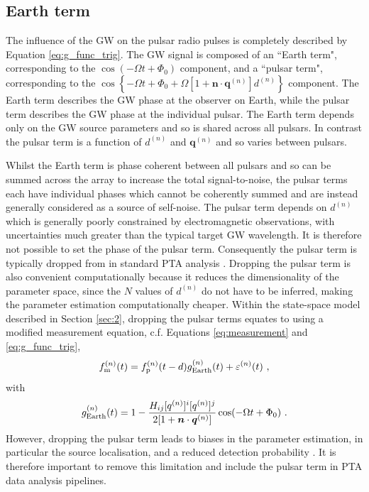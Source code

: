 \documentclass[fleqn,usenatbib,useAMS]{mnras}
\begin{document}
\subsection{Earth term}\label{sec:earth_term}
The influence of the GW on the pulsar radio pulses is completely described by Equation \eqref{eq:g_func_trig}. The GW signal is composed of an ``Earth term", corresponding to the $\cos(-\Omega t + \Phi_0)$ component, and a ``pulsar term", corresponding to the $\cos \left \{-\Omega t +\Phi_0 + \Omega \left[1 + \boldsymbol{n}\cdot \boldsymbol{q}^{(n)} \right]  d^{(n)} \right \}$ component. The Earth term describes the GW phase at the observer on Earth, while the pulsar term describes the GW phase at the individual pulsar. The Earth term depends only on the GW source parameters and so is shared across all pulsars. In contrast the pulsar term is a function of $d^{(n)}$ and $\boldsymbol{q}^{(n)}$ and so varies between pulsars. \newline 


Whilst the Earth term is phase coherent between all pulsars and so can be summed across the array to increase the total signal-to-noise, the pulsar terms each have individual phases which cannot be coherently summed and are instead generally considered as a source of self-noise. The pulsar term depends on $d^{(n)}$ which is generally poorly constrained by electromagnetic observations, with uncertainties much greater than the typical target GW wavelength. It is therefore not possible to set the phase of the pulsar term. Consequently the pulsar term is typically dropped from in standard PTA analysis \citep[e.g.][]{Sesana2010,Babak2012,Petiteau2013,Zhu2015,Taylors2016,Goldstein2018,Charisi2023arXiv230403786C}. Dropping the pulsar term is also convenient computationally because it reduces the dimensionality of the parameter space, since the $N$ values of $d^{(n)}$ do not have to be inferred, making the parameter estimation computationally cheaper. Within the state-space model described in Section \ref{sec:2}, dropping the pulsar terms equates to using a modified measurement equation, c.f. Equations \eqref{eq:measurement} and \eqref{eq:g_func_trig},
\begin{equation}
	f_{\rm m}^{(n)}(t) = f_{\rm p}^{(n)}(t-d) g^{(n)}_{\rm Earth}(t) + \varepsilon^{(n)}(t) \ , 
	\label{eq:measuremen_earth}
\end{equation}
with
\begin{equation}
	g^{(n)}_{\rm Earth}(t) = 1 - \frac{ H_{ij}[q^{(n)}]^i [q^{(n)}]^j}{2[1 + \boldsymbol{n}\cdot \boldsymbol{q}^{(n)}] }  \cos(-\Omega t +\Phi_0)  \ .
	\label{eq:g_func_trig_earth}
\end{equation}
However, dropping the pulsar term leads to biases in the parameter estimation, in particular the source localisation, and a reduced detection probability \citep{Zhupulsarterms,Chen2022,KimpsonPTA}. It is therefore important to remove this limitation and include the pulsar term in PTA data analysis pipelines.
\end{document}

